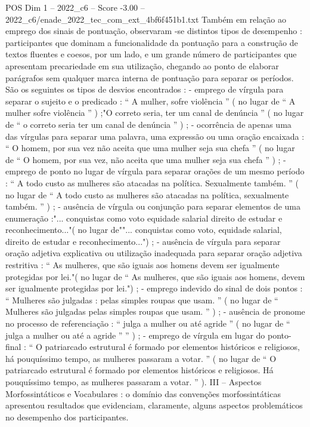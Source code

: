 \begin{textsample}{POS Dim 1 – 2022\_c6 – Score -3.00 – 2022\_c6/enade\_2022\_tec\_com\_ext\_4bf6f451b1.txt}
Também em relação ao emprego dos sinais de pontuação, observaram -se distintos tipos de desempenho : participantes que dominam a funcionalidade da pontuação para a construção de textos fluentes e coesos, por um lado, e um grande número de participantes que apresentam precariedade em sua utilização, chegando ao ponto de elaborar parágrafos sem qualquer marca interna de pontuação para separar os períodos.
São os seguintes os tipos de desvios encontrados : - emprego de vírgula para separar o sujeito e o predicado : “ A mulher, sofre violência ” ( no lugar de “ A mulher sofre violência ” ) ;"O correto seria, ter um canal de denúncia ” ( no lugar de “ o correto seria ter um canal de denúncia ” ) ; - ocorrência de apenas uma das vírgulas para separar uma palavra, uma expressão ou uma oração encaixada : “ O homem, por sua vez não aceita que uma mulher seja sua chefa ” ( no lugar de “ O homem, por sua vez, não aceita que uma mulher seja sua chefa ” ) ; - emprego de ponto no lugar de vírgula para separar orações de um mesmo período : “ A todo custo as mulheres são atacadas na política.
Sexualmente também. ” ( no lugar de “ A todo custo as mulheres são atacadas na política, sexualmente também. ” ) ; - ausência de vírgula ou conjunção para separar elementos de uma enumeração :"... conquistas como voto equidade salarial direito de estudar e reconhecimento..."( no lugar de""... conquistas como voto, equidade salarial, direito de estudar e reconhecimento...") ; - ausência de vírgula para separar oração adjetiva explicativa ou utilização inadequada para separar oração adjetiva restritiva : “ As mulheres, que são iguais aos homens devem ser igualmente protegidas por lei."( no lugar de “ As mulheres, que são iguais aos homens, devem ser igualmente protegidas por lei.") ; - emprego indevido do sinal de dois pontos : “ Mulheres são julgadas : pelas simples roupas que usam. ” ( no lugar de “ Mulheres são julgadas pelas simples roupas que usam. ” ) ; - ausência de pronome no processo de referenciação : “ julga a mulher ou até agride ” ( no lugar de “ julga a mulher ou até a agride ” ” ) ; - emprego de vírgula em lugar do ponto-final : “ O patriarcado estrutural é formado por elementos históricos e religiosos, há pouquíssimo tempo, as mulheres passaram a votar. ” ( no lugar de “ O patriarcado estrutural é formado por elementos históricos e religiosos.
Há pouquíssimo tempo, as mulheres passaram a votar. ” ).
III – Aspectos Morfossintáticos e Vocabulares : o domínio das convenções morfossintáticas apresentou resultados que evidenciam, claramente, alguns aspectos problemáticos no desempenho dos participantes.

\end{textsample}

